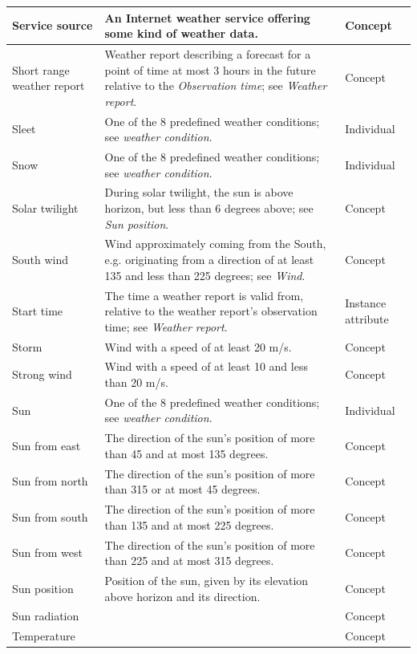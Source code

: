 \begin{longtable}{|p{}|p{}|p{}|}
  \hline
  Service source & An Internet weather service offering some kind of weather data. & Concept \\
  \hline
  Short range weather report & Weather report describing a forecast for a point of time at most 3 hours in the future relative to the \emph{Observation time}; see \emph{Weather report}. & Concept \\
  \hline
  Sleet & One of the 8 predefined weather conditions; see \emph{weather condition}. & Individual \\
  \hline
  Snow & One of the 8 predefined weather conditions; see \emph{weather condition}. & Individual \\
  \hline
  Solar twilight & During solar twilight, the sun is above horizon, but less than 6 degrees above; see \emph{Sun position}. & Concept \\
  \hline
  South wind & Wind approximately coming from the South, e.g. originating from a direction of at least 135 and less than 225 degrees; see \emph{Wind}. & Concept \\
  \hline
  Start time & The time a weather report is valid from, relative to the weather report's observation time; see \emph{Weather report}. & Instance attribute \\
  \hline
  Storm & Wind with a speed of at least 20 m/s. & Concept \\
  \hline
  Strong wind & Wind with a speed of at least 10 and less than 20 m/s. & Concept \\
  \hline
  Sun & One of the 8 predefined weather conditions; see \emph{weather condition}. & Individual \\
  \hline
  Sun from east & The direction of the sun's position of more than 45 and at most 135 degrees. & Concept \\
  \hline
  Sun from north & The direction of the sun's position of more than 315 or at most 45 degrees. & Concept \\
  \hline
  Sun from south & The direction of the sun's position of more than 135 and at most 225 degrees. & Concept \\
  \hline
  Sun from west & The direction of the sun's position of more than 225 and at most 315 degrees. & Concept \\
  \hline
  Sun position & Position of the sun, given by its elevation above horizon and its direction. & Concept \\ %
  \hline
  Sun radiation & & Concept \\ %
  \hline
  Temperature & & Concept \\ %

\end{longtable}
